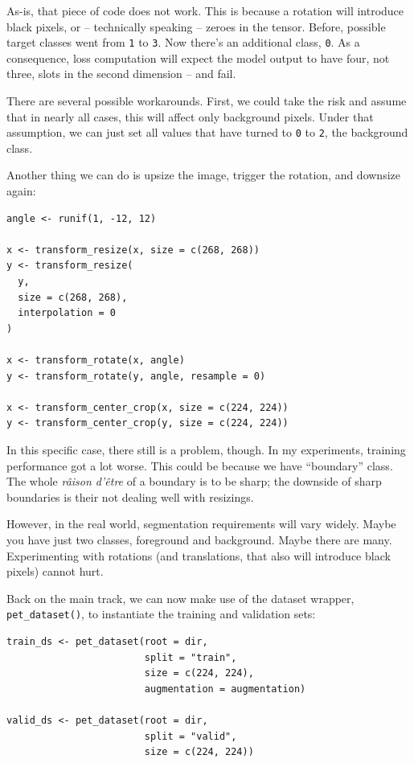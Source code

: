 \documentclass[
  letterpaper,
]{krantz}
\begin{document}
As-is, that piece of code does not work. This is because a rotation will
introduce black pixels, or -- technically speaking -- zeroes in the
tensor. Before, possible target classes went from \texttt{1} to
\texttt{3}. Now there's an additional class, \texttt{0}. As a
consequence, loss computation will expect the model output to have four,
not three, slots in the second dimension -- and fail.

There are several possible workarounds. First, we could take the risk
and assume that in nearly all cases, this will affect only background
pixels. Under that assumption, we can just set all values that have
turned to \texttt{0} to \texttt{2}, the background class.

Another thing we can do is upsize the image, trigger the rotation, and
downsize again:

\begin{verbatim}
angle <- runif(1, -12, 12)

x <- transform_resize(x, size = c(268, 268))
y <- transform_resize(
  y,
  size = c(268, 268),
  interpolation = 0
)

x <- transform_rotate(x, angle)
y <- transform_rotate(y, angle, resample = 0)

x <- transform_center_crop(x, size = c(224, 224))
y <- transform_center_crop(y, size = c(224, 224))
\end{verbatim}

In this specific case, there still is a problem, though. In my
experiments, training performance got a lot worse. This could be because
we have ``boundary'' class. The whole \emph{râison d'être} of a boundary
is to be sharp; the downside of sharp boundaries is their not dealing
well with resizings.

However, in the real world, segmentation requirements will vary widely.
Maybe you have just two classes, foreground and background. Maybe there
are many. Experimenting with rotations (and translations, that also will
introduce black pixels) cannot hurt.

Back on the main track, we can now make use of the dataset wrapper,
\texttt{pet\_dataset()}, to instantiate the training and validation
sets:

\begin{verbatim}
train_ds <- pet_dataset(root = dir,
                        split = "train",
                        size = c(224, 224),
                        augmentation = augmentation)

valid_ds <- pet_dataset(root = dir,
                        split = "valid",
                        size = c(224, 224))
\end{verbatim}
\end{document}
